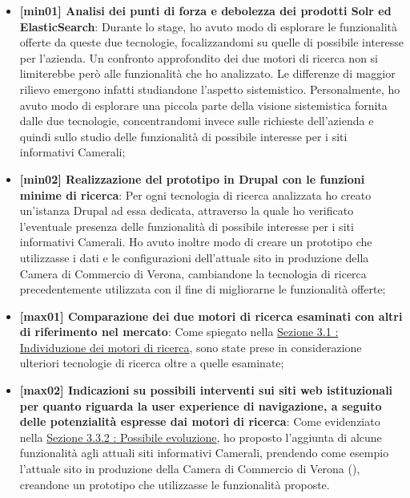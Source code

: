 	\begin{itemize}
		
		\item {\textbf{[min01] Analisi dei punti di forza e debolezza dei prodotti \gls{Solr} ed \gls{ElasticSearch}}: Durante lo stage, ho avuto modo di esplorare le funzionalità offerte da queste due tecnologie, focalizzandomi su quelle di possibile interesse per l'azienda. Un confronto approfondito dei due motori di ricerca non si limiterebbe però alle funzionalità che ho analizzato. Le differenze di maggior rilievo emergono infatti studiandone l'aspetto sistemistico. Personalmente, ho avuto modo di esplorare una piccola parte della visione sistemistica fornita dalle due tecnologie, concentrandomi invece sulle richieste dell'azienda e quindi sullo studio delle funzionalità di possibile interesse per i siti informativi Camerali;}
		
		\item {\textbf{[min02] Realizzazione del prototipo in \gls{Drupal} con le funzioni minime di ricerca}: Per ogni tecnologia di ricerca analizzata ho creato un'istanza \gls{Drupal} ad essa dedicata, attraverso la quale ho verificato l'eventuale presenza delle funzionalità di possibile interesse per i siti informativi Camerali. Ho avuto inoltre modo di creare un prototipo che utilizzasse i dati e le configurazioni dell'attuale sito in produzione della Camera di Commercio di Verona, cambiandone la tecnologia di ricerca precedentemente utilizzata con il fine di migliorarne le funzionalità offerte;}
		
		\item {\textbf{[max01] Comparazione dei due motori di ricerca esaminati con altri di riferimento nel mercato}: Come spiegato nella \hyperref[sec:individuazione_dei_motori_di_ricerca]{Sezione 3.1 : Individuzione dei motori di ricerca}, sono state prese in considerazione ulteriori tecnologie di ricerca oltre a quelle esaminate;}
		
		\item {\textbf{[max02] Indicazioni su possibili interventi sui siti web istituzionali per quanto riguarda la user experience di navigazione, a seguito delle potenzialità espresse dai motori di ricerca}: Come evidenziato nella \hyperref[sub:possibile_evoluzione]{Sezione 3.3.2 : Possibile evoluzione}, ho proposto l'aggiunta di alcune funzionalità agli attuali siti informativi Camerali, prendendo come esempio l'attuale sito in produzione della Camera di Commercio di Verona (\cite{site:vr}), creandone un prototipo che utilizzasse le funzionalità proposte.}
		
	\end{itemize}

